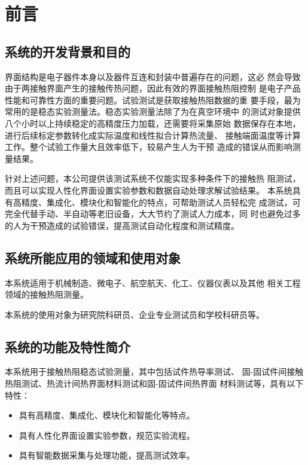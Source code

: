 \chapter{前言}
\section{系统的开发背景和目的}
\par 界面结构是电子器件本身以及器件互连和封装中普遍存在的问题，这必
然会导致由于两接触界面产生的接触传热问题，因此有效的界面接触热阻控制
是电子产品性能和可靠性方面的重要问题。试验测试是获取接触热阻数据的重
要手段，最为常用的是稳态实验测量法。稳态实验测量法除了为在真空环境中
的测试对象提供八个小时以上持续稳定的高精度压力加载，还需要将采集原始
数据保存在本地，进行后续标定参数转化成实际温度和线性拟合计算热流量、
接触端面温度等计算工作。整个试验工作量大且效率低下，较易产生人为干预
造成的错误从而影响测量结果。
\par 针对上述问题，本公司提供该测试系统不仅能实现多种条件下的接触热
阻测试，而且可以实现人性化界面设置实验参数和数据自动处理求解试验结果。
本系统具有高精度、集成化、模块化和智能化的特点，可帮助测试人员轻松完
成测试，可完全代替手动、半自动等老旧设备，大大节约了测试人力成本，同
时也避免过多的人为干预造成的试验错误，提高测试自动化程度和测试精度。

\section{系统所能应用的领域和使用对象}
\par 本系统适用于机械制造、微电子、航空航天、化工、仪器仪表以及其他
相关工程领域的接触热阻测量。
\par 本系统的使用对象为研究院科研员、企业专业测试员和学校科研员等。

\section{系统的功能及特性简介}
\par 本系统用于接触热阻稳态试验测量，其中包括试件热导率测试、
固-固试件间接触热阻测试、热流计间热界面材料测试和固-固试件间热界面
材料测试等，具有以下特性：
\begin{itemize}
    \item 具有高精度、集成化、模块化和智能化等特点。
    \item 具有人性化界面设置实验参数，规范实验流程。
    \item 具有智能数据采集与处理功能，提高测试效率。
\end{itemize}
